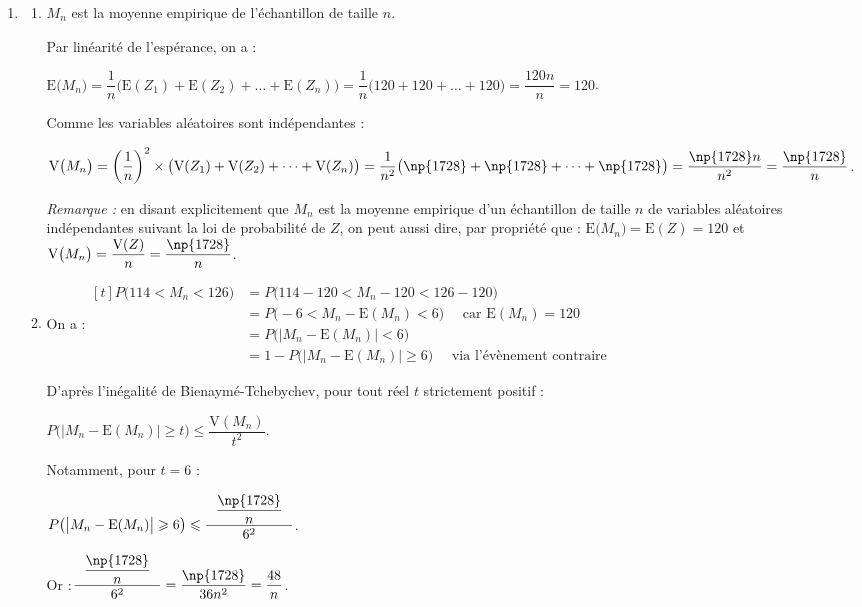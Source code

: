 \begin{enumerate}
		\item \begin{enumerate}
			\item $M_{n}$ est la moyenne empirique de l'échantillon de taille $n$.

			Par linéarité de l'espérance, on a :

			$\mathrm{E}\big(M_{n}\big) = \dfrac{1}{n} \big(\mathrm{E}(Z_1) + \mathrm{E}(Z_2) + \dots + \mathrm{E}(Z_n)\big) = \dfrac{1}{n}\big(120 + 120 + \dots + 120\big) = \dfrac{120n}{n} = 120$.

			Comme les variables aléatoires sont indépendantes :

			$\mathrm{V}\big(M_{n}\big) = \left(\dfrac{1}{n}\right)^2 \times \big(\mathrm{V}(Z_1) + \mathrm{V}(Z_2) + \dots + \mathrm{V}(Z_n)\big) = \dfrac{1}{n^2}\big(\np{1728} + \np{1728} + \dots + \np{1728}\big) = \dfrac{\np{1728}n}{n^2} = \dfrac{\np{1728}}{n}$.

			\emph{Remarque :} en disant explicitement que $M_n$ est la moyenne empirique d'un échantillon de taille $n$ de variables aléatoires indépendantes suivant la loi de probabilité de $Z$, on peut aussi dire, par propriété que :
			\quad
			$\mathrm{E}\big(M_{n}\big) = \mathrm{E}(Z)= 120$ \quad et \quad $\mathrm{V}\big(M_{n}\big) = \dfrac{\mathrm{V}(Z)}{n}= \dfrac{\np{1728}}{n}$.

			\item On a :\quad $\begin{aligned}[t]
				P\big(114 < M_n < 126\big)
					&= P\big(114 - 120 < M_n - 120 < 126 - 120\big) \\
					&= P\big(-6 < M_n - \mathrm{E}(M_n) < 6\big)\quad \text{ car } \mathrm{E}(M_n)= 120\\
					&= P\big(\big|M_n - \mathrm{E}(M_n)\big| < 6\big)\\
					&= 1 - P\big(\big|M_n - \mathrm{E}(M_n)\big| \geqslant 6\big) \quad \text{ via l'évènement contraire}
			\end{aligned}$

			D'après l'inégalité de Bienaymé-Tchebychev, pour tout réel $t$ strictement positif :

			$P\big(\big|M_n - \mathrm{E}(M_n)\big| \geqslant t\big) \leqslant \dfrac{\mathrm{V}(M_n)}{t^2}$.

			Notamment, pour $t = 6$ :

			$P\big(\big|M_n - \mathrm{E}(M_n)\big| \geqslant 6\big) \leqslant \dfrac{~~\dfrac{\np{1728}}{n}~~}{6^2}$.

			Or :\quad $\dfrac{~~\dfrac{\np{1728}}{n}~~}{6^2} = \dfrac{\np{1728}}{36n^2} = \dfrac{48}{n}$.


\end{enumerate}
\end{enumerate}
